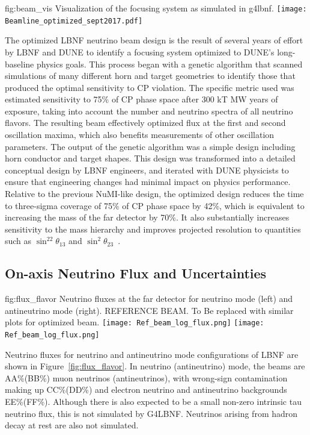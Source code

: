 \begin{dunefigure}{fig:beam_vis}
{Visualization of the focusing system as simulated in g4lbnf.}
    \texttt{[image: Beamline\_optimized\_sept2017.pdf]}\end{dunefigure}


The optimized LBNF neutrino beam design is the result of several years of effort by LBNF and DUNE to identify a focusing system optimized to DUNE's long-baseline physics goals.  This process began with a genetic algorithm that scanned simulations of many different horn and target geometries to identify those that produced the optimal sensitivity to CP violation.  The specific metric used was estimated sensitivity to 75\% of CP phase space after 300 kT MW years of exposure, taking into account the number and neutrino spectra of all neutrino flavors. The resulting beam effectively optimized flux at the first and second oscillation maxima, which also benefits measurements of other oscillation parameters.  The output of the genetic algorithm was a simple design including horn conductor and target shapes.  This design was transformed into a detailed conceptual design by LBNF engineers, and iterated with DUNE physicists to ensure that engineering changes had minimal impact on physics performance.  Relative to the previous NuMI-like design, the optimized design reduces the time to three-sigma coverage of 75\% of CP phase space by 42\%, which is equivalent to increasing the mass of the far detector by 70\%.  It also substantially increases sensitivity to the mass hierarchy and improves projected resolution to quantities such as $\sin^22\theta_{13}$ and $\sin^2\theta_{23}$~\cite{fields_doc_2901}.        

\subsection{On-axis Neutrino Flux and Uncertainties}

\begin{dunefigure}{fig:flux_flavor}
{Neutrino fluxes at the far detector for neutrino mode (left) and
antineutrino mode (right).  REFERENCE BEAM.  To Be replaced with similar plots for optimized beam. }
    \texttt{[image: Ref\_beam\_log\_flux.png]}
     \texttt{[image: Ref\_beam\_log\_flux.png]}
\end{dunefigure}


Neutrino fluxes for neutrino and antineutrino mode configurations of LBNF are shown in Figure~\ref{fig:flux_flavor}.  In neutrino (antineutrino) mode, the beams are AA\%(BB\%) muon neutrinos (antineutrinos), with wrong-sign contamination making up CC\%(DD\%) and electron neutrino and antineutrino backgrounds EE\%(FF\%).  Although there is also expected to be a small non-zero intrinsic tau neutrino flux, this is not simulated by G4LBNF.  Neutrinos arising from hadron decay at rest are also not simulated.  

